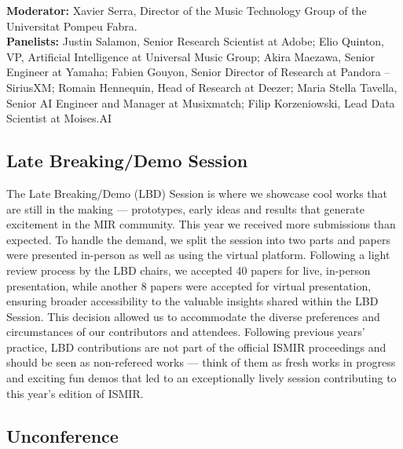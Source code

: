 \textbf{Moderator:} Xavier Serra, Director of the Music Technology Group of the Universitat Pompeu Fabra.\\
\textbf{Panelists:}
Justin Salamon, Senior Research Scientist at Adobe;
Elio Quinton, VP, Artificial Intelligence at Universal Music Group;
Akira Maezawa, Senior Engineer at Yamaha; 
Fabien Gouyon, Senior Director of Research at Pandora -- SiriusXM; 
Romain Hennequin, Head of Research at Deezer; 
Maria Stella Tavella, Senior AI Engineer and Manager at Musixmatch; 
Filip Korzeniowski, Lead Data Scientist at Moises.AI


\subsection*{Late Breaking/Demo Session}

The Late Breaking/Demo (LBD) Session is where we showcase cool works that are still in the making --- prototypes, early ideas and results that generate excitement in the MIR community. This year we received more submissions than expected. To handle the demand, we split the session into two parts and papers were presented in-person as well as using the virtual platform. Following a light review process by the LBD chairs, we accepted 40 papers for live, in-person presentation, while another 8 papers were accepted for virtual presentation, ensuring broader accessibility to the valuable insights shared within the LBD Session. This decision allowed us to accommodate the diverse preferences and circumstances of our contributors and attendees. Following previous years’ practice, LBD contributions are not part of the official ISMIR proceedings and should be seen as non-refereed works — think of them as fresh works in progress and exciting fun demos that led to an exceptionally lively session contributing to this year’s edition of ISMIR. 


\subsection*{Unconference}

